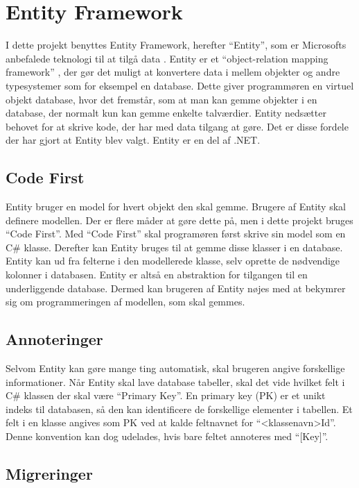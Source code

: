 \section{Entity Framework}
\label{sec:entity}
I dette projekt benyttes Entity Framework, herefter \enquote{Entity}, som er Microsofts anbefalede teknologi til at tilgå data \cite{entity}. Entity er et \enquote{object-relation mapping framework} \cite{lerman2010programming}, der gør det muligt at konvertere data i mellem objekter og andre typesystemer som for eksempel en database. Dette giver programmøren en virtuel objekt database, hvor det fremstår, som at man kan gemme objekter i en database, der normalt kun kan gemme enkelte talværdier. Entity nedsætter behovet for at skrive kode, der har med data tilgang at gøre. Det er disse fordele der har gjort at Entity blev valgt. Entity er en del af .NET.


\subsection{Code First}
\label{sub:code_first}
Entity bruger en model for hvert objekt den skal gemme. Brugere af Entity skal definere modellen. Der er flere måder at gøre dette på, men i dette projekt bruges \enquote{Code First}. Med \enquote{Code First} skal programøren først skrive sin model som en C\# klasse. Derefter kan Entity bruges til at gemme disse klasser i en database. Entity kan ud fra felterne i den modellerede klasse, selv oprette de nødvendige kolonner i databasen. Entity er altså en abstraktion for tilgangen til en underliggende database. Dermed kan brugeren af Entity nøjes med at bekymrer sig om programmeringen af modellen, som skal gemmes.

\subsection{Annoteringer}
\label{sub:annoteringer}
Selvom Entity kan gøre mange ting automatisk, skal brugeren angive forskellige informationer. Når Entity skal lave database tabeller, skal det vide hvilket felt i C\# klassen der skal være \enquote{Primary Key}. En primary key (PK) er et unikt indeks til databasen, så den kan identificere de forskellige elementer i tabellen. Et felt i en klasse angives som PK ved at kalde feltnavnet for \enquote{<klassenavn>Id}. Denne konvention kan dog udelades, hvis bare feltet annoteres med \enquote{[Key]}.

\subsection{Migreringer}
\label{sub:migreringer}

